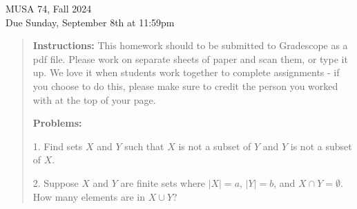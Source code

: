 \documentclass[11pt]{article}
\begin{document}
\maketitle
\fontsize{12}{15}\selectfont

\begin{center}
  MUSA 74, Fall 2024 \\
  Due Sunday, September 8th at 11:59pm \\
\end{center}

\begin{quote}
  \textbf{Instructions:} This homework should to be submitted to
  Gradescope as a pdf file. Please work on separate sheets of paper and
  scan them, or type it up. We love it when students work together to
  complete assignments - if you choose to do this, please make sure to
  credit the person you worked with at the top of your page.
  
  \textbf{Problems:}
  
  1. Find sets $X$ and $Y$ such that $X$ is not a subset of
  $Y$ and $Y$ is not a subset of $X$.
  
  2. Suppose $X$ and $Y$ are finite sets where 
  $\lvert X\rvert=a$, 
  $\lvert Y\rvert=b$, and 
  $X\cap Y=\emptyset$.
  How many elements are in $X\cup Y$?
  
  
\end{quote}
  
  
  
\end{document}

